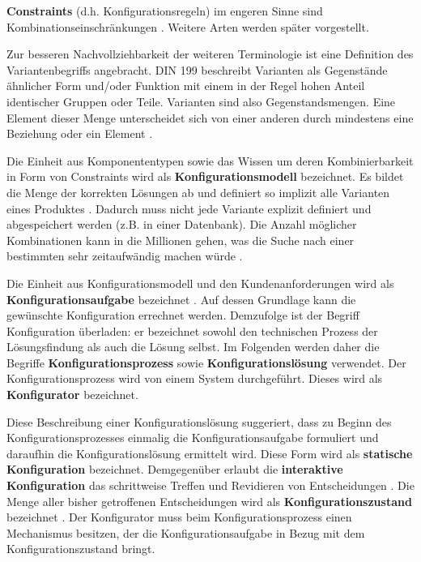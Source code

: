 \documentclass[12pt,a4paper,bibliography=totocnumbered,listof=totoc]{scrartcl}
\begin{document}
\textbf{Constraints} (d.h. Konfigurationsregeln) im engeren Sinne sind Kombinationseinschränkungen \citep{felferning14}. Weitere Arten werden später vorgestellt.

Zur besseren Nachvollziehbarkeit der weiteren Terminologie ist eine Definition des Variantenbegriffs angebracht. DIN 199 beschreibt Varianten als \glqq Gegenstände ähnlicher Form und/oder Funktion mit einem in der Regel hohen Anteil identischer Gruppen oder Teile\grqq{}. Varianten sind also Gegenstandsmengen. Eine Element dieser Menge unterscheidet sich von einer anderen durch mindestens eine Beziehung oder ein Element \citep{lutz11}.

Die Einheit aus Komponententypen sowie das Wissen um deren Kombinierbarkeit in Form von Constraints wird als \textbf{Konfigurationsmodell} bezeichnet. Es bildet die Menge der korrekten Lösungen ab und definiert so implizit alle Varianten eines Produktes \citep{soininen98}. Dadurch muss nicht jede Variante explizit definiert und abgespeichert werden (z.B. in einer Datenbank). Die Anzahl möglicher Kombinationen kann in die Millionen gehen, was die Suche nach einer bestimmten sehr zeitaufwändig machen würde \citep{falkner11}.

Die Einheit aus Konfigurationsmodell und den Kundenanforderungen wird als \textbf{Konfigurationsaufgabe} bezeichnet \citep{felferning14}. Auf dessen Grundlage kann die gewünschte Konfiguration errechnet werden. Demzufolge ist der Begriff Konfiguration überladen: er bezeichnet sowohl den technischen Prozess der Lösungsfindung als auch die Lösung selbst. Im Folgenden werden daher die Begriffe \textbf{Konfigurationsprozess} sowie \textbf{Konfigurationslösung} verwendet. Der Konfigurationsprozess wird von einem System durchgeführt. Dieses wird als \textbf{Konfigurator} bezeichnet.

Diese Beschreibung einer Konfigurationslösung suggeriert, dass zu Beginn des Konfigurationsprozesses einmalig die Konfigurationsaufgabe formuliert und daraufhin die Konfigurationslösung ermittelt wird. Diese Form wird als \textbf{statische Konfiguration} bezeichnet. Demgegenüber erlaubt die \textbf{interaktive Konfiguration} das schrittweise Treffen und Revidieren von Entscheidungen \citep{hadzic04}. Die Menge aller bisher getroffenen Entscheidungen wird als \textbf{Konfigurationszustand} bezeichnet \citep{tactonTCsiteDevelopmentManual}. Der Konfigurator muss beim Konfigurationsprozess einen Mechanismus besitzen, der die Konfigurationsaufgabe in Bezug mit dem Konfigurationszustand bringt.
\end{document}

